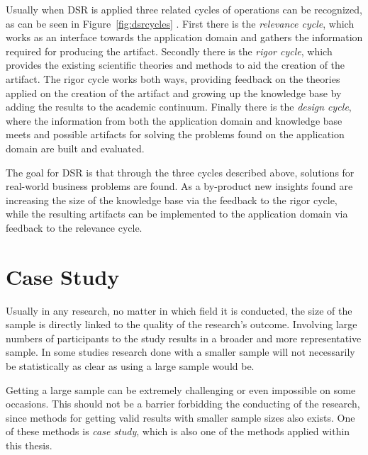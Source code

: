 Usually when DSR is applied three related cycles of operations can be recognized, as can be seen in Figure~\ref{fig:dsrcycles} \cite{hevner_three_2007}. First there is the \textit{relevance cycle}, which works as an interface towards the application domain and gathers the information required for producing the artifact. Secondly there is the \textit{rigor cycle}, which provides the existing scientific theories and methods to aid the creation of the artifact. The rigor cycle works both ways, providing feedback on the theories applied on the creation of the artifact and growing up the knowledge base by adding the results to the academic continuum. Finally there is the \textit{design cycle}, where the information from both the application domain and knowledge base meets and possible artifacts for solving the problems found on the application domain are built and evaluated. 

The goal for DSR is that through the three cycles described above, solutions for real-world business problems are found. As a by-product new insights found are increasing the size of the knowledge base via the feedback to the rigor cycle, while the resulting artifacts can be implemented to the application 	domain via feedback to the relevance cycle. \cite{piirainen_constructive_2013}








\section{Case Study}

Usually in any research, no matter in which field it is conducted, the size of the sample is directly linked to the quality of the research's outcome. Involving large numbers of participants to the study results in a broader and more representative sample. In some studies research done with a smaller sample will not necessarily be statistically as clear as using a large sample would be. \cite[Page 144]{lazar_research_2010}

Getting a large sample can be extremely challenging or even impossible on some occasions. This should not be a barrier forbidding the conducting of the research, since methods for getting valid results with smaller sample sizes also exists. One of these methods is \textit{case study}, which is also one of the methods applied within this thesis. \cite[Page 144]{lazar_research_2010}

